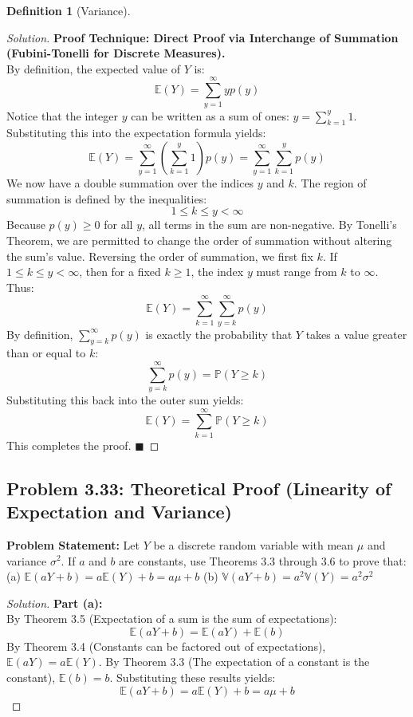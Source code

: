 \documentclass[11pt,letterpaper]{article}
\theoremstyle{definition}
\newtheorem{definition}{Definition}[section]
\theoremstyle{plain}
\theoremstyle{remark}
\newcommand{\E}{\mathbb{E}}
\newcommand{\V}{\mathbb{V}}
\newcommand{\Prob}{\mathbb{P}}
\begin{document}
\begin{definition}[Variance]
\begin{proof}[Solution]
\textbf{Proof Technique: Direct Proof via Interchange of Summation (Fubini-Tonelli for Discrete Measures).}\\
By definition, the expected value of $Y$ is:
\[ \E(Y) = \sum_{y=1}^\infty y p(y) \]
Notice that the integer $y$ can be written as a sum of ones: $y = \sum_{k=1}^y 1$. Substituting this into the expectation formula yields:
\[ \E(Y) = \sum_{y=1}^\infty \left( \sum_{k=1}^y 1 \right) p(y) = \sum_{y=1}^\infty \sum_{k=1}^y p(y) \]
We now have a double summation over the indices $y$ and $k$. The region of summation is defined by the inequalities:
\[ 1 \le k \le y < \infty \]
Because $p(y) \ge 0$ for all $y$, all terms in the sum are non-negative. By Tonelli's Theorem, we are permitted to change the order of summation without altering the sum's value. 
Reversing the order of summation, we first fix $k$. If $1 \le k \le y < \infty$, then for a fixed $k \ge 1$, the index $y$ must range from $k$ to $\infty$. Thus:
\[ \E(Y) = \sum_{k=1}^\infty \sum_{y=k}^\infty p(y) \]
By definition, $\sum_{y=k}^\infty p(y)$ is exactly the probability that $Y$ takes a value greater than or equal to $k$:
\[ \sum_{y=k}^\infty p(y) = \Prob(Y \ge k) \]
Substituting this back into the outer sum yields:
\[ \E(Y) = \sum_{k=1}^\infty \Prob(Y \ge k) \]
This completes the proof. $\blacksquare$
\end{proof}

\subsection{Problem 3.33: Theoretical Proof (Linearity of Expectation and Variance)}
\textbf{Problem Statement:} Let $Y$ be a discrete random variable with mean $\mu$ and variance $\sigma^2$. If $a$ and $b$ are constants, use Theorems 3.3 through 3.6 to prove that:
(a) $\E(aY + b) = a\E(Y) + b = a\mu + b$
(b) $\V(aY + b) = a^2 \V(Y) = a^2 \sigma^2$

\begin{proof}[Solution]
\textbf{Part (a):}\\
By Theorem 3.5 (Expectation of a sum is the sum of expectations):
\[ \E(aY + b) = \E(aY) + \E(b) \]
By Theorem 3.4 (Constants can be factored out of expectations), $\E(aY) = a\E(Y)$.
By Theorem 3.3 (The expectation of a constant is the constant), $\E(b) = b$.
Substituting these results yields:
\[ \E(aY + b) = a\E(Y) + b = a\mu + b \]


\end{proof}
\end{definition}
\end{document}
